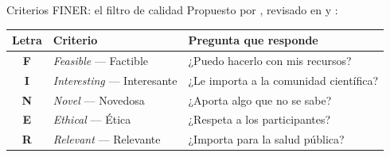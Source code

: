 \documentclass[12pt, aspectratio=169]{beamer}
\begin{document}
\begin{frame}{Criterios FINER: el filtro de calidad}
  Propuesto por \textcite{Hulley2013_designing}, revisado en
  \textcite{Hosseini2024_formulating} y \textcite{Covvey2024_basics}:

  \medskip
  \begin{center}
    \begin{tabular}{@{}cll@{}}
      \toprule
      \textbf{Letra} & \textbf{Criterio} & \textbf{Pregunta que responde} \\
      \midrule
      \textbf{F} & \textit{Feasible} — Factible & ¿Puedo hacerlo con mis recursos? \\[3pt]
      \textbf{I} & \textit{Interesting} — Interesante & ¿Le importa a la comunidad científica? \\[3pt]
      \textbf{N} & \textit{Novel} — Novedosa & ¿Aporta algo que no se sabe? \\[3pt]
      \textbf{E} & \textit{Ethical} — Ética & ¿Respeta a los participantes? \\[3pt]
      \textbf{R} & \textit{Relevant} — Relevante & ¿Importa para la salud pública? \\
      \bottomrule
    \end{tabular}
  \end{center}
\end{frame}
\end{document}
